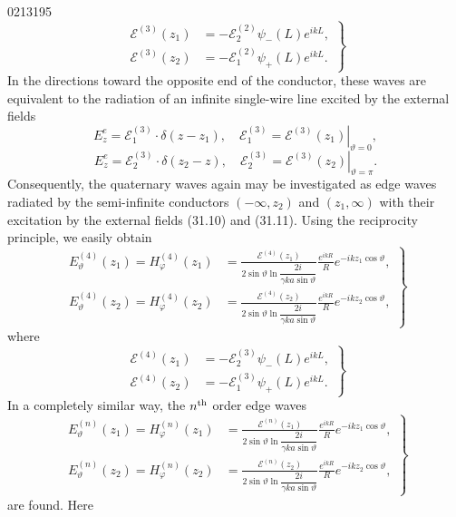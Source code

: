 \begin{scanpage}{0213}{195}
\[\left.\begin{aligned}
\mathcal E^{(3)}(z_1)&=-\mathcal E_2^{(2)}\psi_-(L)e^{ikL},\\
\mathcal E^{(3)}(z_2)&=-\mathcal E_1^{(2)}\psi_+(L)e^{ikL}.
\end{aligned}\right\}\tag{31.09}\]
In the directions toward the opposite end of the conductor, these waves are equivalent to the radiation of an infinite single-wire line excited by the external fields
\[E_z^e=\mathcal E_1^{(3)}\cdot\delta(z-z_1),\quad\mathcal E_1^{(3)}=\left.\mathcal E^{(3)}(z_1)\right|_{\vartheta=0},\tag{31.10}\]
\[E_z^e=\mathcal E_2^{(3)}\cdot\delta(z_2-z),\quad\mathcal E_2^{(3)}=\left.\mathcal E^{(3)}(z_2)\right|_{\vartheta=\pi}.\tag{31.11}\]
Consequently, the quaternary waves again may be investigated as edge waves radiated by the semi-infinite conductors $(-\infty,z_2)$ and $(z_1,\infty)$ with their excitation by the external fields (31.10) and (31.11). Using the reciprocity principle, we easily obtain
\[\left.\begin{aligned}
E_\vartheta^{(4)}(z_1)=H_\varphi^{(4)}(z_1)&=\frac{\mathcal E^{(4)}(z_1)}{2\sin\vartheta\ln\dfrac{2i}{\gamma ka\sin\vartheta}}\frac{e^{ikR}}R e^{-ikz_1\cos\vartheta},\\
E_\vartheta^{(4)}(z_2)=H_\varphi^{(4)}(z_2)&=\frac{\mathcal E^{(4)}(z_2)}{2\sin\vartheta\ln\dfrac{2i}{\gamma ka\sin\vartheta}}\frac{e^{ikR}}R e^{-ikz_2\cos\vartheta},
\end{aligned}\right\}\tag{31.12}\]
where
\[\left.\begin{aligned}
\mathcal E^{(4)}(z_1)&=-\mathcal E_2^{(3)}\psi_-(L)e^{ikL},\\
\mathcal E^{(4)}(z_2)&=-\mathcal E_1^{(3)}\psi_+(L)e^{ikL}.
\end{aligned}\right\}\tag{31.13}\]
In a completely similar way, the $n^{\rm th}$ order edge waves
\[\left.\begin{aligned}
E_\vartheta^{(n)}(z_1)=H_\varphi^{(n)}(z_1)&=\frac{\mathcal E^{(n)}(z_1)}{2\sin\vartheta\ln\dfrac{2i}{\gamma ka\sin\vartheta}}\frac{e^{ikR}}R e^{-ikz_1\cos\vartheta},\\
E_\vartheta^{(n)}(z_2)=H_\varphi^{(n)}(z_2)&=\frac{\mathcal E^{(n)}(z_2)}{2\sin\vartheta\ln\dfrac{2i}{\gamma ka\sin\vartheta}}\frac{e^{ikR}}R e^{-ikz_2\cos\vartheta},
\end{aligned}\right\}\tag{31.14}\]
are found. Here
\end{scanpage}
